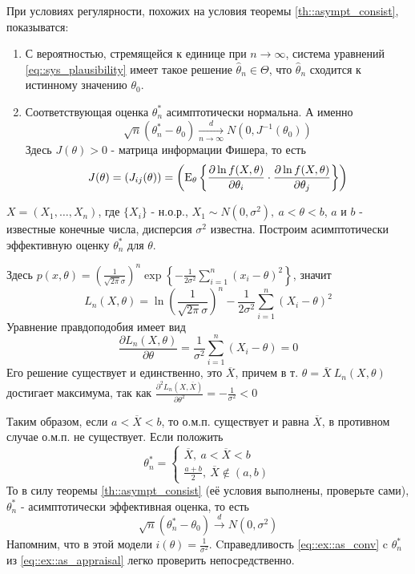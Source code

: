 При условиях регулярности, похожих на условия теоремы \ref{th::asympt_consist},
показыватся:
\begin{enumerate}
    \item С вероятностью, стремящейся к единице при \(n \rightarrow \infty\),
        система уравнений \eqref{eq::sys_plausibility} имеет такое решение \(\widehat{\theta}_n\in\Theta\),
        что \(\widehat{\theta}_n\) сходится к истинному значению \(\theta_0\).
    \item Соответствующая оценка \(\theta^*_n\) асимптотически нормальна. А именно
        \[\sqrt{n}(\theta^*_n - \theta_0) \xrightarrow[n\rightarrow\infty]{d} N(0, J^{-1}(\theta_0))\]
        Здесь \(J(\theta) > 0\) - матрица информации Фишера, то есть
        \[J(\theta) = (J_{ij}(\theta)) = \left(\mathrm{E}_\theta \left\{\frac{\partial \ln f(X, \theta)}{\partial\theta_i} \cdot \frac{\partial\ln f(X, \theta)}{\partial\theta_j}\right\}\right)\]
\end{enumerate}
\begin{example}
    \(X = (X_1, \ldots, X_n)\), где \(\{X_i\}\) - н.о.р., \(X_1 \sim N(0, \sigma^2),\ a < \theta < b\),
    \(a\) и \(b\) - известные конечные числа, дисперсия \(\sigma^2\) известна.
    Построим асимптотически эффективную оценку \(\theta^*_n\) для \(\theta\).

    Здесь \(p(x, \theta) = \left(\frac{1}{\sqrt{2\pi} \sigma}\right)^n\exp{\left\{-\frac{1}{2\sigma^2}\sum_{i=1}^n (x_i-\theta)^2\right\}}\),
    значит
    \[L_n(X, \theta) = \ln\left(\frac{1}{\sqrt{2\pi}\sigma}\right)^n - \frac{1}{2\sigma^2}\sum_{i=1}^n(X_i-\theta)^2\]
    Уравнение правдоподобия имеет вид
    \[\frac{\partial L_n(X, \theta)}{\partial\theta} = \frac{1}{\sigma^2}\sum_{i=1}^n(X_i - \theta) = 0\]
    Его решение существует и единственно, это \(\overline{X}\), причем
    в т. \(\theta = \overline{X}\ L_n(X,\theta)\) достигает максимума,
    так как \(\frac{\partial^2 L_n(X, \overline{X})}{\partial\theta^2} = - \frac{1}{\sigma^2} < 0\)

    Таким образом, если \(a < \overline{X} < b\), то о.м.п. существует и равна \(\overline{X}\),
    в противном случае о.м.п. не существует. Если положить
    \begin{equation}
        \label{eq::ex::as_appraisal}
        \theta^*_n = \begin{cases}
            \overline{X},\ a < \overline{X} < b \\
            \frac{a+b}{2},\ \overline{X} \notin (a,b)
        \end{cases}
    \end{equation}
    То в силу теоремы \ref{th::asympt_consist} (её условия
    выполнены, проверьте сами), \(\theta^*_n\) - асимптотически эффективная оценка, то есть
    \begin{equation}
        \label{eq::ex::as_conv}
        \sqrt{n}(\theta^*_n - \theta_0) \xrightarrow{d} N(0, \sigma^2)
    \end{equation}
    Напомним, что в этой модели \(i(\theta) = \frac{1}{\sigma^2}\).
    Cправедливость \eqref{eq::ex::as_conv} c \(\theta^*_n\)
    из \eqref{eq::ex::as_appraisal} легко проверить непосредственно.
\end{example}
